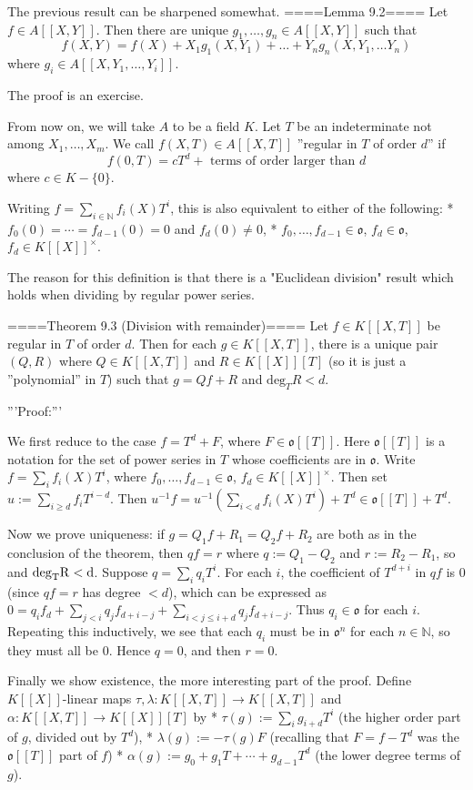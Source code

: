 The previous result can be sharpened somewhat.
====Lemma 9.2==== Let $f\in A[[X,Y]]$. Then there are unique $g_1,\ldots, g_n\in A[[X,Y]]$ such that
$$f(X,Y)=f(X)+X_1 g_1(X, Y_1)+\ldots + Y_n g_n(X, Y_1,\ldots Y_n)$$
where $g_i\in A[[X,Y_1,\ldots, Y_i]]$. 

The proof is an exercise.

From now on, we will take $A$ to be a field $K$. Let $T$ be an indeterminate not among $X_1,\ldots, X_m$. We call $f(X,T)\in A[[X,T]]$ ''regular in $T$ of order $d$'' if 
$$f(0,T)=cT^d+\textrm{ terms of order larger than }d$$
where $c\in K-\{0\}$.

Writing $f=\sum_{i\in\mathbb{N}} f_i(X)T^i$, this is also equivalent to either of the following:
* $f_0(0)=\cdots =f_{d-1}(0)=0$ and $f_d(0)\neq 0$,
* $f_0,\ldots, f_{d-1}\in \mathfrak{o}$, $f_d\in \mathfrak{o}$, $f_d\in K[[X]]^\times$.

The reason for this definition is that there is a "Euclidean division" result which holds when dividing by regular power series.

====Theorem 9.3 (Division with remainder)====
Let $f\in K[[X,T]]$ be regular in $T$ of order $d$. Then for each $g\in K[[X,T]]$, there is a unique pair $(Q,R)$ where $Q\in K[[X,T]]$ and $R\in K[[X]][T]$ (so it is just a ''polynomial'' in $T$) such that $g=Qf+R$ and $\mathrm{deg}_TR<d$.

'''Proof:'''

We first reduce to the case $f=T^d+F$, where $F\in\mathfrak{o}[[T]]$. Here $\mathfrak{o}[[T]]$ is a notation for the set of power series in $T$ whose coefficients are in $\mathfrak{o}$. Write $f=\sum_i f_i(X) T^i$, where $f_0,\ldots, f_{d-1}\in\mathfrak{o}$, $f_d\in K[[X]]^\times$. Then set $u:=\sum_{i\ge d} f_i T^{i-d}$. Then $u^{-1}f= u^{-1}(\sum_{i<d} f_i(X)T^i)+T^d\in \mathfrak{o}[[T]]+T^d$.

Now we prove uniqueness: if $g=Q_1f+R_1=Q_2f+R_2$ are both as in the conclusion of the theorem, then $qf=r$ where $q:=Q_1-Q_2$ and $r:=R_2-R_1$, so and $\rm{deg}_TR<d$. Suppose $q=\sum_i q_i T^i$. For each $i$, the coefficient of $T^{d+i}$ in $qf$ is 0 (since $qf=r$ has degree $<d$), which can be expressed as $0=q_if_d+\sum_{j<i}q_jf_{d+i-j}+\sum_{i<j\le i+d}q_jf_{d+i-j}$. Thus $q_i\in \mathfrak{o}$ for each $i$. Repeating this inductively, we see that each $q_i$ must be in $\mathfrak{o}^n$ for each $n\in \mathbb{N}$, so they must all be $0$. Hence $q=0$, and then $r=0$.

Finally we show existence, the more interesting part of the proof. Define $K[[X]]$-linear maps $\tau,\lambda:K[[X,T]]\rightarrow K[[X,T]]$ and $\alpha:K[[X,T]]\rightarrow K[[X]][T]$ by 
* $\tau(g):=\sum_i g_{i+d} T^i$ (the higher order part of $g$, divided out by $T^d$),
* $\lambda(g):=-\tau(g)F$ (recalling that $F=f-T^d$ was the $\mathfrak{o}[[T]]$ part of $f$)
* $\alpha(g):=g_0+g_1T+\cdots+g_{d-1}T^d$ (the lower degree terms of $g$).

